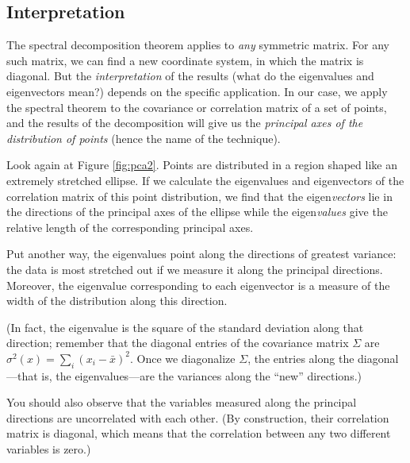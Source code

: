 
\subsection{Interpretation}

 
The spectral decomposition theorem applies to \emph{any} symmetric
matrix. For any such matrix, we can find a new coordinate system, in
which the matrix is diagonal. But the \emph{interpretation} of the
results (what do the eigenvalues and eigenvectors mean?) depends on
the specific application.  In our case, we apply the spectral theorem
to the covariance or correlation matrix of a set of points, and the
results of the decomposition will give us the \emph{principal axes of
  the distribution of points} (hence the name of the technique).

Look again at Figure \ref{fig:pca2}. Points are distributed in a
region shaped like an extremely stretched ellipse. If we calculate the
eigenvalues and eigenvectors of the correlation matrix of this point
distribution, we find that the eigen\emph{vectors} 
lie in the directions of the principal axes
of the ellipse while the eigen\emph{values} give the relative length of
the corresponding principal axes.

Put another way, the eigenvalues point along the directions of
greatest variance: the data is most stretched out if we measure it
along the principal directions. Moreover, the eigenvalue corresponding
to each eigenvector is a measure of the width of the distribution along
this direction. 

(In fact, the eigenvalue is the square of the standard deviation along
that direction; remember that the diagonal entries of the covariance
matrix $\Sigma$ are $\sigma^2(x) = \sum_i (x_i - \bar{x})^2$.  Once we
diagonalize $\Sigma$, the entries along the diagonal---that is, the
eigenvalues---are the variances along the ``new'' directions.)

You should also observe that the variables measured along the
principal directions are uncorrelated with each other. (By
construction, their correlation matrix is diagonal, which means that
the correlation between any two different variables is zero.)

